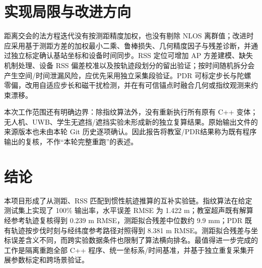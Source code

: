 \section{实现局限与改进方向}
距离交会的法方程迭代没有按测距精度加权，也没有剔除 NLOS 离群值；改进时应采用基于测距方差的加权最小二乘、鲁棒损失、几何精度因子与残差诊断，并通过独立标定确认基站坐标和设备时间同步。RSS 定位可增加 AP 方差建模、缺失机制处理、设备 RSS 偏差校准以及按轨迹段划分的留出验证；按时间随机拆分会产生空间/时间泄漏风险，应优先采用独立采集段验证。PDR 可标定步长与陀螺零偏，改用自适应步长和磁干扰检测，并在有可信锚点时融合几何或指纹观测来约束漂移。

本次工作范围还有明确边界：除指纹算法外，没有重新执行所有原有 C++ 变体；无人机、UWB、学生无遮挡/遮挡实验未形成新的独立复算结果。原始输出文件的来源版本也未由本轮 Git 历史逐项确认。因此报告将教室/PDR结果称为既有程序输出的复核，不作“本轮完整重跑”的表述。

\section{结论}
本项目形成了从测距、RSS 匹配到惯性航迹推算的互补实验链。指纹算法在给定测试集上实现了 100\% 输出率，水平误差 RMSE 为 1.422 m；教室超声既有解算经参考轨迹复核得到 0.239 m RMSE，测距拟合残差中位数约 9.9 mm；PDR 既有轨迹按步伐时刻与经纬度参考路径对照得到 8.381 m RMSE。测距拟合残差与坐标误差含义不同，而跨实验数据条件也限制了算法横向排名。最值得进一步完成的工作是隔离重跑全部 C++ 程序、统一坐标系/时间基准，并基于独立重复采集开展参数标定和跨场景验证。

